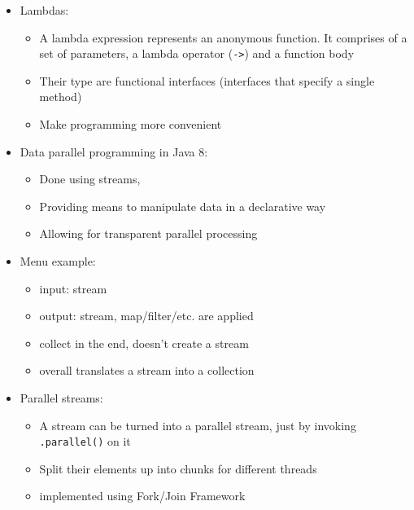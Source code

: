 \documentclass[a4paper]{article}
\newcommand{\inline}[1]{\lstinline!#1!}%
\begin{document}
\begin{itemize}
\item Lambdas:
\begin{itemize}
\item A lambda expression represents an anonymous function. It comprises of a set of parameters, a lambda operator (\inline{->}) and a function body
\item Their type are functional interfaces (interfaces that specify a single method)
\item Make programming more convenient
\end{itemize}
\item Data parallel programming in Java 8:
\begin{itemize}
\item Done using streams, 
\item Providing means to manipulate data in a declarative way
\item Allowing for transparent parallel processing
\end{itemize}
\item Menu example: 
\begin{itemize}
\item input: stream
\item output: stream, map/filter/etc. are applied
\item collect in the end, doesn't create a stream
\item overall translates a stream into a collection
\end{itemize}
\item Parallel streams: 
\begin{itemize}
\item A stream can be turned into a parallel stream, just by invoking \inline{.parallel()} on it
\item Split their elements up into chunks for different threads
\item implemented using Fork/Join Framework
\end{itemize}
\end{itemize}
\end{document}
